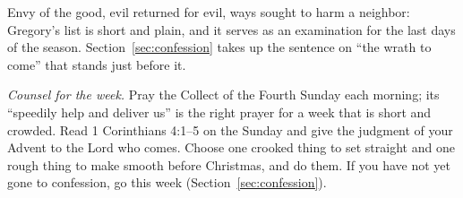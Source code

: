 \noindent Envy of the good, evil returned for evil, ways sought to harm a neighbor: Gregory's list
is short and plain, and it serves as an examination for the last days of the season.
Section~\ref{sec:confession} takes up the sentence on ``the wrath to come'' that stands just
before it.

\medskip
\noindent\textit{Counsel for the week.} Pray the Collect of the Fourth Sunday each morning; its
``speedily help and deliver us'' is the right prayer for a week that is short and crowded. Read 1
Corinthians 4:1--5 on the Sunday and give the judgment of your Advent to the Lord who comes. Choose
one crooked thing to set straight and one rough thing to make smooth before Christmas, and do
them. If you have not yet gone to confession, go this week (Section~\ref{sec:confession}).
